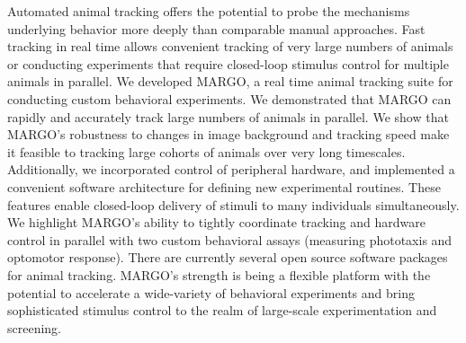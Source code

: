 \documentclass[10pt]{article}
\begin{document}
Automated animal tracking offers the potential to probe the mechanisms underlying behavior more deeply than comparable manual approaches. Fast tracking in real time allows convenient tracking of very large numbers of animals or conducting experiments that require closed-loop stimulus control for multiple animals in parallel. We developed MARGO, a real time animal tracking suite for conducting custom behavioral experiments. We demonstrated that MARGO can rapidly and accurately track large numbers of animals in parallel. We show that MARGO's robustness to changes in image background and tracking speed make it feasible to tracking large cohorts of animals over very long timescales. Additionally, we incorporated control of peripheral hardware, and implemented a convenient software architecture for defining new experimental routines. These features enable closed-loop delivery of stimuli to many individuals simultaneously. We highlight MARGO's ability to tightly coordinate tracking and hardware control in parallel with two custom behavioral assays (measuring phototaxis and optomotor response). There are currently several open source software packages for animal tracking. MARGO’s strength is being a flexible platform with the potential to accelerate a wide-variety of behavioral experiments and bring sophisticated stimulus control to the realm of large-scale experimentation and screening.
\end{document}
